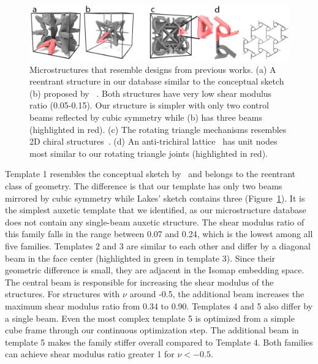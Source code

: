 \begin{figure}
	\includegraphics[width=0.9\columnwidth]{images/similarShape.png}
	\caption{Microstructures that resemble designs from previous works. (a) A reentrant structure in our database similar to the conceptual sketch (b) proposed by ~\citet{lakes1987foam}. Both structures have very low shear modulus ratio (0.05-0.15). Our structure is simpler with only two control beams reflected by cubic symmetry while (b) has three beams (highlighted in red). (c) The rotating triangle mechanisms resembles 2D chiral structures~\citep{prall1997properties}. (d) An anti-trichiral lattice~\citep{alderson2010elastic} has unit nodes most similar to our rotating triangle joints (highlighted in red).}
	\label{fig:similarShape}
\end{figure}
Template 1 resembles the conceptual sketch by~\citet{lakes1987foam} and belongs to the reentrant class of geometry. The difference is that our template has only two beams mirrored by cubic symmetry while Lakes' sketch contains three (Figure~\ref{fig:similarShape}). It is the simplest auxetic template that we identified, as our microstructure database does not contain any single-beam auxetic structure. The shear modulus ratio of this family falls in the range between 0.07 and 0.24, which is the lowest among all five families. Templates 2 and 3 are similar to each other and differ by a diagonal beam in the face center (highlighted in green in template 3). Since their geometric difference is small, they are adjacent in the Isomap embedding space. The central beam is responsible for increasing the shear modulus of the structures. For structures with $\nu$ around -0.5, the additional beam increases the maximum shear modulus ratio from 0.34 to 0.90. Templates 4 and 5 also differ by a single beam. Even the most complex template 5 is optimized from a simple cube frame through our continuous optimization step. The additional beam in template 5 makes the family stiffer overall compared to Template 4. Both families can achieve shear modulus ratio greater 1 for $\nu<-0.5$.

